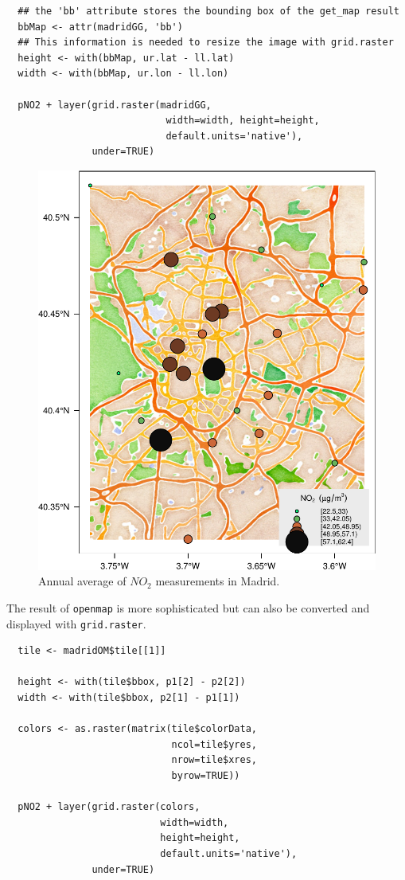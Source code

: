 \lstset{language=r,label= ,caption= ,captionpos=b,numbers=none}
\begin{lstlisting}
  ## the 'bb' attribute stores the bounding box of the get_map result
  bbMap <- attr(madridGG, 'bb')
  ## This information is needed to resize the image with grid.raster
  height <- with(bbMap, ur.lat - ll.lat)
  width <- with(bbMap, ur.lon - ll.lon)
  
  pNO2 + layer(grid.raster(madridGG,
                            width=width, height=height,
                            default.units='native'),
               under=TRUE)
\end{lstlisting}

\begin{figure}[htbp]
\centering
\includegraphics[width=.9\linewidth]{figs/airMadrid_stamen.pdf}
\caption{\label{fig:org261a66a}
Annual average of \(NO_2\) measurements in Madrid.}
\end{figure}

The result of \texttt{openmap} is more sophisticated but can also be
converted and displayed with \texttt{grid.raster}.
\lstset{language=r,label= ,caption= ,captionpos=b,numbers=none}
\begin{lstlisting}
  tile <- madridOM$tile[[1]]
  
  height <- with(tile$bbox, p1[2] - p2[2])
  width <- with(tile$bbox, p2[1] - p1[1])
  
  colors <- as.raster(matrix(tile$colorData,
                             ncol=tile$yres,
                             nrow=tile$xres,
                             byrow=TRUE))
  
  pNO2 + layer(grid.raster(colors,
                           width=width,
                           height=height,
                           default.units='native'),
               under=TRUE)
  
\end{lstlisting}

